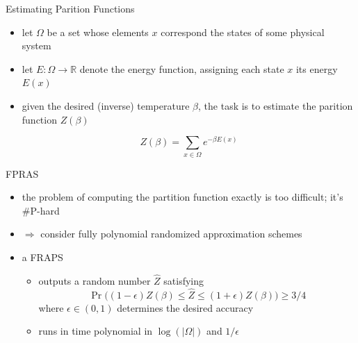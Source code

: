 \documentclass[slideColor]{prosper}
\renewcommand{\>}{\rangle}
\newcommand{\<}{\langle}
\begin{document}
\begin{slide}{Estimating Parition Functions}
\begin{itemize}
\item let $\Omega$ be a set whose elements $x$ correspond the states of some physical system

\bigskip
\item let $E : \Omega\rightarrow \mathbb{R}$ denote the energy function, assigning each state $x$ its energy $E(x)$

\bigskip
\item given the desired (inverse) temperature $\beta$, the task is to estimate the parition function $Z(\beta)$

\[
Z(\beta) = \sum_{x\in\Omega} e^{-\beta E(x)}
\]
\end{itemize}

\end{slide}


\begin{slide}{FPRAS}
\begin{itemize}
\item the problem of computing the partition function exactly is too difficult; it's \#P-hard

\medskip
\item $\Rightarrow$ consider fully polynomial randomized approximation schemes

\medskip
\item a FRAPS

\begin{itemize}
\item outputs a random number $\hat{Z}$ satisfying
\[
\Pr\Big( (1-\epsilon)Z(\beta) \le \hat{Z} \le (1+\epsilon) Z(\beta) \Big) \ge 3/4
\]
where $\epsilon\in (0,1)$ determines the desired accuracy

\medskip
\item runs in time polynomial in $\log(|\Omega|)$ and $1/\epsilon$
\end{itemize}
\end{itemize}
\end{slide}

\end{document}
